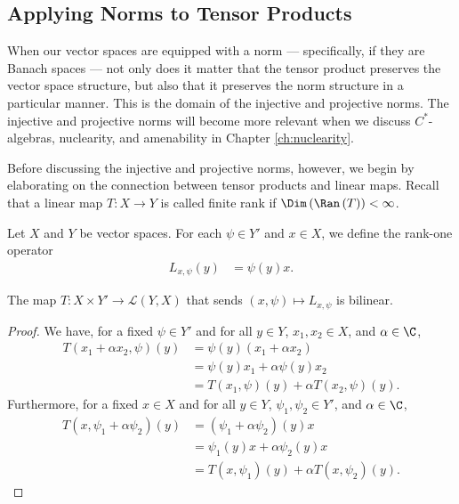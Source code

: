 \subsection{Applying Norms to Tensor Products}%
When our vector spaces are equipped with a norm --- specifically, if they are Banach spaces --- not only does it matter that the tensor product preserves the vector space structure, but also that it preserves the norm structure in a particular manner. This is the domain of the injective and projective norms. The injective and projective norms will become more relevant when we discuss $C^{\ast}$-algebras, nuclearity, and amenability in Chapter \ref{ch:nuclearity}.\newline
 
Before discussing the injective and projective norms, however, we begin by elaborating on the connection between tensor products and linear maps. Recall that a linear map $T\colon X\rightarrow Y$ is called finite rank if $\Dim\left( \Ran\left( T \right) \right) < \infty$.
\begin{definition}
  Let $X$ and $Y$ be vector spaces. For each $\psi \in Y'$ and $x\in X$, we define the rank-one operator
  \begin{align*}
    L_{x,\psi}\left( y \right) &= \psi\left( y \right)x.
  \end{align*}
\end{definition}
\begin{fact}
  The map $T\colon X\times Y'\rightarrow \mathcal{L}\left( Y,X \right)$ that sends $\left( x,\psi \right)\mapsto L_{x,\psi}$ is bilinear.
\end{fact}
\begin{proof}
  We have, for a fixed $\psi\in Y'$ and for all $y\in Y$, $x_1,x_2\in X$, and $\alpha\in\C$,
  \begin{align*}
    T\left( x_1 + \alpha x_2,\psi \right)(y) &= \psi\left( y \right)\left( x_1 + \alpha x_2 \right)\\
                                             &= \psi\left( y \right)x_1 + \alpha \psi\left( y \right)x_2\\
                                             &= T\left( x_1,\psi \right)\left( y \right) + \alpha T\left( x_2,\psi \right)\left( y \right).
  \end{align*}
  Furthermore, for a fixed $x\in X$ and for all $y\in Y$, $\psi_1,\psi_2\in Y'$, and $\alpha\in \C$,
  \begin{align*}
    T\left( x,\psi_1 + \alpha \psi_2 \right)\left( y \right) &= \left( \psi_1 + \alpha \psi_2 \right)\left( y \right)x\\
                                                             &= \psi_1\left( y \right)x + \alpha \psi_2\left( y \right)x\\
                                                             &= T\left( x,\psi_1 \right)\left( y \right) + \alpha T\left( x,\psi_2 \right)\left( y \right).
  \end{align*}
\end{proof}
